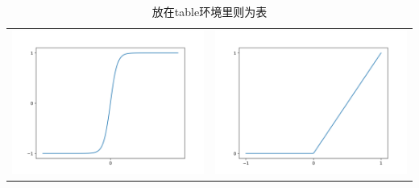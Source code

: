 \documentclass[UTF8,a4paper,8pt,no-math]{article} %
\numberwithin{equation}{section} %
\begin{document}
\begin{table}[h]
	\center
	\begin{tabular}{|c|c|}
		\includegraphics[scale=0.5]{tanh.png}
		 &
		\includegraphics[scale=0.5]{relu.png} \\
	\end{tabular}
	\caption{放在table环境里则为表}
\end{table}
\end{document}

